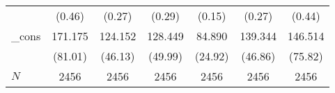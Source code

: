 {\begin{tabular}{l*{6}{c}}
            &                   (0.46)         &                   (0.27)         &                   (0.29)         &                   (0.15)         &                   (0.27)         &                   (0.44)         \\
\_cons      &                  171.175\sym{*}  &                  124.152\sym{**} &                  128.449\sym{*}  &                   84.890\sym{***}&                  139.344\sym{**} &                  146.514         \\
            &                  (81.01)         &                  (46.13)         &                  (49.99)         &                  (24.92)         &                  (46.86)         &                  (75.82)         \\
\hline
\(N\)       &                     2456         &                     2456         &                     2456         &                     2456         &                     2456         &                     2456         \\
\hline\hline
\end{tabular}
}
